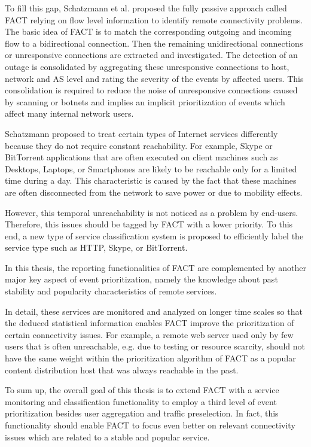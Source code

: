 To fill this gap, Schatzmann et al. proposed the fully passive approach called FACT\cite{SchatzmannPAM2011} relying on flow level information to
identify remote connectivity problems. The basic idea of FACT is to
match the corresponding outgoing and incoming flow to a bidirectional
connection. Then the remaining unidirectional connections or unresponsive
connections are extracted and investigated. The detection of an outage
is consolidated by aggregating these unresponsive connections to host,
network and AS level and rating the severity of the events by affected
users. This consolidation is required to reduce the noise of unresponsive
connections caused by scanning or botnets and implies an
implicit prioritization of events which affect many internal network
users.

Schatzmann\cite{SchatzmanThesis2012} proposed to treat certain types 
of Internet services differently because they do not require constant 
reachability. For example, Skype or BitTorrent applications that
are often executed on client machines such as Desktops, Laptops, or
Smartphones are likely to be reachable only for a limited time during a day.
This characteristic is caused by the fact that these machines are often
disconnected from the network to save power or due to mobility effects.

However, this temporal unreachability is not noticed as a problem by end-users.
Therefore, this issues should be tagged by FACT with a lower priority.
To this end, a new type of service classification system is proposed to efficiently label the service type such as HTTP, Skype, or BitTorrent.

In this thesis, the reporting functionalities of FACT are complemented by
another major key aspect of event prioritization, namely the knowledge
about past stability and popularity characteristics of remote services.

In detail, these services are monitored and analyzed on longer time scales
so that the deduced statistical information enables FACT improve
the prioritization of certain connectivity issues. For example, a
remote web server used only by few users that is often unreachable, e.g. due to testing or resource scarcity, should not have the same weight within
the prioritization algorithm of FACT as a popular content distribution
host that was always reachable in the past.

To sum up, the overall goal of this thesis is to extend FACT with
a service monitoring and classification functionality to employ a
third level of event prioritization besides user aggregation and traffic
preselection. In fact, this functionality should enable FACT to focus
even better on relevant connectivity issues which are related to a stable
and popular service.


